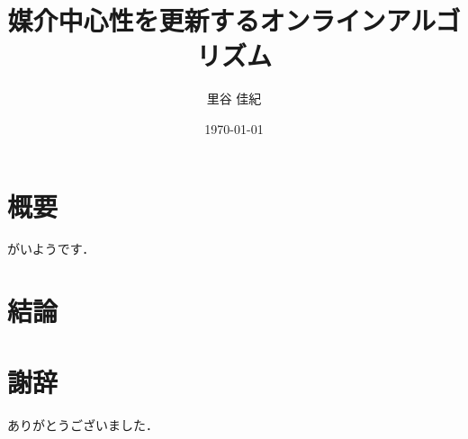 \documentclass{jreport}
\title{媒介中心性を更新するオンラインアルゴリズム}
\author{里谷 佳紀}
\date{\today}
\begin{document}
\maketitle

\chapter*{概要}
がいようです．

\setcounter{tocdepth}{1}
\tableofcontents




\chapter{結論}

\chapter*{謝辞}
ありがとうございました．

\appendix

%
\printbibliography[title=参考文献]
\end{document}
